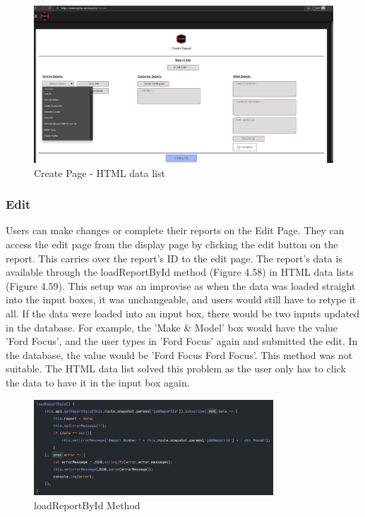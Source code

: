 \begin{figure}[H]
    \centering
    \caption{Create Page - HTML data list}
    \label{image:HTMLdatalist}
    \includegraphics[width=1.0\textwidth]{images/repota/UI/create-data.png}
\end{figure}

\subsubsection{Edit}
Users can make changes or complete their reports on the Edit Page. They can access the edit page from the display page by clicking the edit button on the report. This carries over the report's ID to the edit page. The report's data is available through the loadReportById method (Figure 4.58) in HTML data lists (Figure 4.59). This setup was an improvise as when the data was loaded straight into the input boxes, it was unchangeable, and users would still have to retype it all. If the data were loaded into an input box, there would be two inputs updated in the database. For example, the 'Make \& Model' box would have the value 'Ford Focus', and the user types in 'Ford Focus' again and submitted the edit. In the database, the value would be 'Ford Focus Ford Focus'. This method was not suitable. The HTML data list solved this problem as the user only has to click the data to have it in the input box again.

\begin{figure}[H]
    \centering
    \caption{loadReportById Method}
    \label{image:loadReportById}
    \includegraphics[width=0.8\textwidth]{images/repota/report_pages/load_report.png}
\end{figure}

